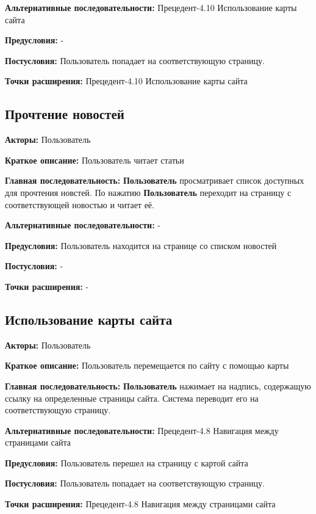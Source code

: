 \textbf{Альтернативные последовательности:} Прецедент-4.10 Использование карты сайта

\textbf{Предусловия:} -

\textbf{Постусловия:} Пользователь попадает на соответствующую страницу.

\textbf{Точки расширения:} Прецедент-4.10 Использование карты сайта




\subsection{Прочтение новостей}

\textbf{Акторы:} Пользователь

\textbf{Краткое описание:} Пользователь читает статьи

\textbf{Главная последовательность:} \textbf{Пользователь} просматривает список доступных для прочтения новстей. По нажатию
\textbf{Пользователь} переходит на страницу с соответствующей новостью и читает её.

\textbf{Альтернативные последовательности:} -

\textbf{Предусловия:} Пользователь находится на странице со списком новостей

\textbf{Постусловия:} -

\textbf{Точки расширения:} -




\subsection{Использование карты сайта}

\textbf{Акторы:} Пользователь

\textbf{Краткое описание:} Пользователь перемещается по сайту с помощью карты

\textbf{Главная последовательность:} \textbf{Пользователь} нажимает на надпись, содержащую ссылку на определенные страницы сайта. Система
переводит его на соответствующую страницу.

\textbf{Альтернативные последовательности:} Прецедент-4.8 Навигация между страницами сайта

\textbf{Предусловия:} Пользователь перешел на страницу с картой сайта

\textbf{Постусловия:} Пользователь попадает на соответствующую страницу.

\textbf{Точки расширения:} Прецедент-4.8 Навигация между страницами сайта




